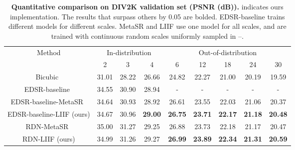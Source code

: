 \documentclass[final]{cvpr}
\begin{document}
\begin{table*}[]
    \centering
    \begin{tabular}{c|ccc|ccccc}
        \multirow{2}{*}{Method} & \multicolumn{3}{c|}{In-distribution} & \multicolumn{5}{c}{Out-of-distribution} \\
        & 2 & 3 & 4 & 6 & 12 & 18 & 24 & 30 \\
        \hline
        Bicubic~\cite{lim2017enhanced} & 31.01 & 28.22 & 26.66 & 24.82 & 22.27 & 21.00 & 20.19 & 19.59 \\
        EDSR-baseline~\cite{lim2017enhanced} & 34.55 & 30.90 & 28.94 & - & - & - & - & - \\
        EDSR-baseline-MetaSR~\cite{hu2019meta} & 34.64 & 30.93 & 28.92 & 26.61 & 23.55 & 22.03 & 21.06 & 20.37 \\
        EDSR-baseline-LIIF (ours) & 34.67 & 30.96 & \textbf{29.00} & \textbf{26.75} & \textbf{23.71} & \textbf{22.17} & \textbf{21.18} & \textbf{20.48} \\
        \hline
        RDN-MetaSR~\cite{hu2019meta} & 35.00 & 31.27 & 29.25 & 26.88 & 23.73 & 22.18 & 21.17 & 20.47 \\
        RDN-LIIF (ours) & 34.99 & 31.26 & 29.27 & \textbf{26.99} & \textbf{23.89} & \textbf{22.34} & \textbf{21.31} & \textbf{20.59} \\
    \end{tabular}
    \caption{\textbf{Quantitative comparison on DIV2K validation set (PSNR (dB)).}  indicates ours implementation. The results that surpass others by 0.05 are bolded. EDSR-baseline trains different models for different scales. MetaSR and LIIF use one model for all scales, and are trained with continuous random scales uniformly sampled in --.}
    \label{tab:div2k}
\end{table*}
\end{document}
